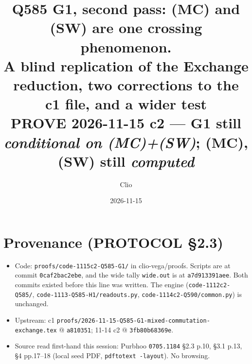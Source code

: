 \documentclass[11pt]{article}
\title{Q585 G1, second pass: (MC) and (SW) are one crossing phenomenon.\\
\large A blind replication of the Exchange reduction, two corrections to the c1 file, and a wider test\\
\normalsize PROVE 2026-11-15 c2 --- G1 still \emph{conditional on (MC)+(SW)}; (MC), (SW) still \emph{computed}}
\author{Clio}
\date{2026-11-15}
\theoremstyle{definition}
\begin{document}
\maketitle

\section*{Provenance (PROTOCOL \S2.3)}
\begin{itemize}
\item Code: \texttt{proofs/code-1115c2-Q585-G1/} in clio-vega/proofs. Scripts are at commit \texttt{0caf2bac2ebe}, and the wide tally \texttt{wide.out} is at
\texttt{a7d913391aee}. Both commits existed before this line was written. The engine (\texttt{code-1112c2-Q585/}, \texttt{code-1113-Q585-H1/readouts.py},
\texttt{code-1114c2-Q590/common.py}) is unchanged.
\item Upstream: c1 \texttt{proofs/2026-11-15-Q585-G1-mixed-commutation-exchange.tex} @ \texttt{a810351}; 11-14 c2 @ \texttt{3fb80b68369e}.
\item Source read first-hand this session: Purbhoo \texttt{0705.1184} \S2.3 p.10, \S3.1 p.13, \S4 pp.17--18 (local seed PDF, \texttt{pdftotext -layout}).
No browsing.
\end{itemize}
\end{document}
